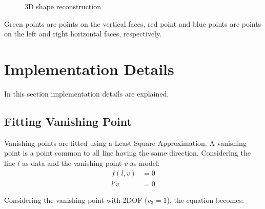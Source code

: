 \documentclass[11pt, oneside]{article}   	%
\begin{document}
\begin{figure}
 \centering
    \qquad
    \caption{3D shape reconstruction}%
    \label{3d_sr}%
\end{figure}

Green points are points on the vertical faces, red point and blue points are points on the left and right horizontal faces, respectively.

\section{Implementation Details}
In this section implementation details are explained.
\subsection{Fitting Vanishing Point} \label{secvp}
Vanishing points are fitted using a Least Square Approximation.
A vanishing point is a point common to all line having the same direction. 
Considering the line $l$ as data and the vanishing point $v$ as model:
\begin{subequations}
\begin{align*}
f(l,v)&=0 \\
l'v &= 0
\end{align*}
\end{subequations}

Considering the vanishing point with 2DOF ($v_3=1$), the equation becomes:
\end{document}
